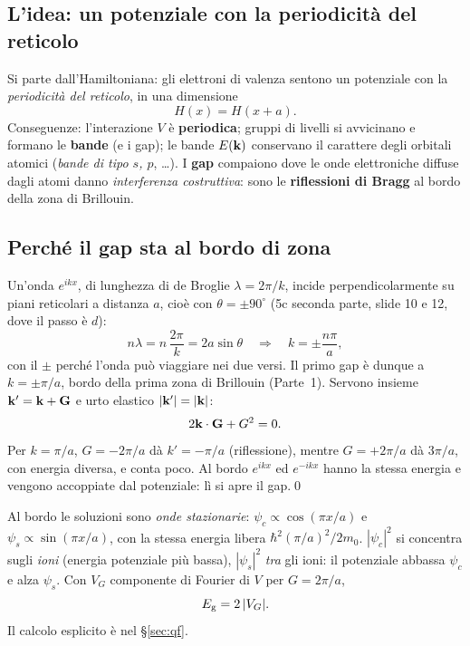 \documentclass[11pt,a4paper]{article}
\begin{document}
\subsection{L'idea: un potenziale con la periodicità del reticolo}
Si parte dall'Hamiltoniana: gli elettroni di valenza sentono un potenziale con la \emph{periodicità del reticolo}, in una dimensione
\[
H(x)=H(x+a).
\]
Conseguenze: l'interazione $V$ è \textbf{periodica}; gruppi di livelli si avvicinano e formano le \textbf{bande} (e i gap); le bande $E(\mathbf k)$
conservano il carattere degli orbitali atomici (\emph{bande di tipo $s$, $p$}, \dots). I \textbf{gap} compaiono dove le onde elettroniche
diffuse dagli atomi danno \emph{interferenza costruttiva}: sono le \textbf{riflessioni di Bragg} al bordo della zona di Brillouin.

\subsection{Perché il gap sta al bordo di zona}
\begin{dimostrazione}[il gap si apre a $k=n\pi/a$]
Un'onda $e^{ikx}$, di lunghezza di de Broglie $\lambda=2\pi/k$, incide perpendicolarmente su piani reticolari a distanza $a$, cioè con $\theta=\pm90^\circ$
(5c seconda parte, slide 10 e 12, dove il passo è $d$):
\[
n\lambda=n\,\frac{2\pi}k=2a\sin\theta\quad\Longrightarrow\quad k=\pm\frac{n\pi}a ,
\]
con il $\pm$ perché l'onda può viaggiare nei due versi. Il primo gap è dunque a $k=\pm\pi/a$, bordo della prima zona di Brillouin (Parte~1).
Servono insieme $\mathbf k'=\mathbf k+\mathbf G$ e urto elastico $|\mathbf k'|=|\mathbf k|$:
\[
2\mathbf k\cdot\mathbf G+G^2=0 .
\]
Per $k=\pi/a$, $G=-2\pi/a$ dà $k'=-\pi/a$ (riflessione), mentre $G=+2\pi/a$ dà $3\pi/a$, con energia diversa, e conta poco.
Al bordo $e^{ikx}$ ed $e^{-ikx}$ hanno la stessa energia e vengono accoppiate dal potenziale: lì si apre il gap.\qed
\end{dimostrazione}

\begin{approfondimento}
Al bordo le soluzioni sono \emph{onde stazionarie}: $\psi_c\propto\cos(\pi x/a)$ e $\psi_s\propto\sin(\pi x/a)$, con la stessa energia libera
$\hbar^2(\pi/a)^2/2m_0$. $|\psi_c|^2$ si concentra sugli \emph{ioni} (energia potenziale più bassa), $|\psi_s|^2$ \emph{tra} gli ioni: il potenziale
abbassa $\psi_c$ e alza $\psi_s$. Con $V_G$ componente di Fourier di $V$ per $G=2\pi/a$,
\[
E_{\mathrm g}=2\,|V_G|.
\]
Il calcolo esplicito è nel §\ref{sec:qf}.
\end{approfondimento}
\end{document}
